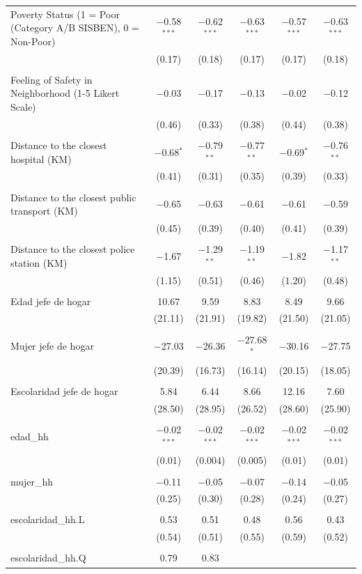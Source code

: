 \begin{table}[H]
\begin{tabularx}{0.9\textwidth}{@{\extracolsep{-7pt}}lccccc}
 Poverty Status (1 = Poor (Category A/B SISBEN), 0 = Non-Poor) & $-$0.58$^{***}$ & $-$0.62$^{***}$ & $-$0.63$^{***}$ & $-$0.57$^{***}$ & $-$0.63$^{***}$ \\    & (0.17) & (0.18) & (0.17) & (0.17) & (0.18) \\    & & & & & \\   Feeling of Safety in Neighborhood (1-5 Likert Scale) & $-$0.03 & $-$0.17 & $-$0.13 & $-$0.02 & $-$0.12 \\    & (0.46) & (0.33) & (0.38) & (0.44) & (0.38) \\    & & & & & \\   Distance to the closest hospital (KM) & $-$0.68$^{*}$ & $-$0.79$^{**}$ & $-$0.77$^{**}$ & $-$0.69$^{*}$ & $-$0.76$^{**}$ \\    & (0.41) & (0.31) & (0.35) & (0.39) & (0.33) \\    & & & & & \\   Distance to the closest public transport  (KM) & $-$0.65 & $-$0.63 & $-$0.61 & $-$0.61 & $-$0.59 \\    & (0.45) & (0.39) & (0.40) & (0.41) & (0.39) \\    & & & & & \\   Distance to the closest police station (KM) & $-$1.67 & $-$1.29$^{**}$ & $-$1.19$^{**}$ & $-$1.82 & $-$1.17$^{**}$ \\    & (1.15) & (0.51) & (0.46) & (1.20) & (0.48) \\    & & & & & \\   Edad jefe de hogar & 10.67 & 9.59 & 8.83 & 8.49 & 9.66 \\    & (21.11) & (21.91) & (19.82) & (21.50) & (21.05) \\    & & & & & \\   Mujer jefe de hogar & $-$27.03 & $-$26.36 & $-$27.68$^{*}$ & $-$30.16 & $-$27.75 \\    & (20.39) & (16.73) & (16.14) & (20.15) & (18.05) \\    & & & & & \\   Escolaridad jefe de hogar & 5.84 & 6.44 & 8.66 & 12.16 & 7.60 \\    & (28.50) & (28.95) & (26.52) & (28.60) & (25.90) \\    & & & & & \\   edad\_hh & $-$0.02$^{***}$ & $-$0.02$^{***}$ & $-$0.02$^{***}$ & $-$0.02$^{***}$ & $-$0.02$^{***}$ \\    & (0.01) & (0.004) & (0.005) & (0.01) & (0.01) \\    & & & & & \\   mujer\_hh & $-$0.11 & $-$0.05 & $-$0.07 & $-$0.14 & $-$0.05 \\    & (0.25) & (0.30) & (0.28) & (0.24) & (0.27) \\    & & & & & \\   escolaridad\_hh.L & 0.53 & 0.51 & 0.48 & 0.56 & 0.43 \\    & (0.54) & (0.51) & (0.55) & (0.59) & (0.52) \\    & & & & & \\   escolaridad\_hh.Q & 0.79 & 0.83 & 
\end{tabularx}
\end{table}
